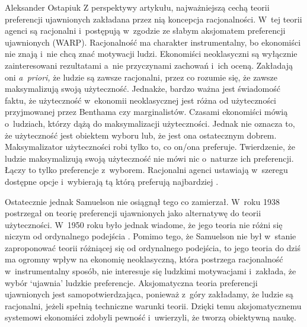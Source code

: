 \begin{artplenv}{Aleksander Ostapiuk}
Z perspektywy artykułu, najważniejszą cechą teorii preferencji ujawnionych zakładana przez nią koncepcja racjonalności.
W~tej teorii agenci są racjonalni i~postępują w~zgodzie ze słabym aksjomatem preferencji ujawnionych (WARP).
Racjonalność ma charakter instrumentalny, bo ekonomiści nie znają i~nie chcą znać motywacji ludzi. Ekonomiści
neoklasyczni są wyłącznie zainteresowani rezultatami a~nie przyczynami zachowań i~ich oceną. Zakładają oni
\textit{a~priori,} że ludzie są zawsze racjonalni, przez co rozumie się, że zawsze maksymalizują swoją użyteczność. Jednakże,
bardzo ważna jest świadomość faktu, że użyteczność w~ekonomii neoklasycznej jest różna od użyteczności przyjmowanej
przez Benthama czy marginalistów. Czasami ekonomiści mówią o~ludziach, którzy dążą do maksymalizacji użyteczności.
Jednak nie oznacza to, że użyteczność jest obiektem wyboru lub, że jest ona ostatecznym dobrem. Maksymalizator
użyteczności robi tylko to, co on/ona preferuje. Twierdzenie, że ludzie maksymalizują swoją użyteczność nie mówi
nic o~naturze ich preferencji. Łączy to tylko preferencje z~wyborem. Racjonalni agenci ustawiają w~szeregu dostępne
opcje i~wybierają tą którą preferują najbardziej
\parencite[s.~18]{hausman_inexact_1992}.

Ostatecznie jednak Samuelson nie osiągnął tego co zamierzał. W~roku 1938 postrzegał on teorię preferencji ujawnionych
jako alternatywę do teorii użyteczności. W~1950 roku było jednak wiadome, że jego teoria nie różni się niczym od
ordynalnego podejścia
\parencite{wong_foundations_2006}.
Pomimo tego, że Samuelson nie był w~stanie
zaproponować teorii różniącej się od ordynalnego podejścia, to jego teoria do dziś ma ogromny wpływ na ekonomię
neoklasyczną, która postrzega racjonalność w~instrumentalny sposób, nie interesuje się ludzkimi motywacjami i~zakłada,
że wybór `ujawnia' ludzkie preferencje. Aksjomatyczna teoria preferencji ujawnionych jest samopotwierdzająca, ponieważ
z~góry zakładamy, że ludzie są racjonalni, jeżeli spełnią techniczne warunki teorii. Dzięki temu aksjomatycznemu
systemowi ekonomiści zdobyli pewność i~uwierzyli, że tworzą obiektywną naukę. 


\end{artplenv}

